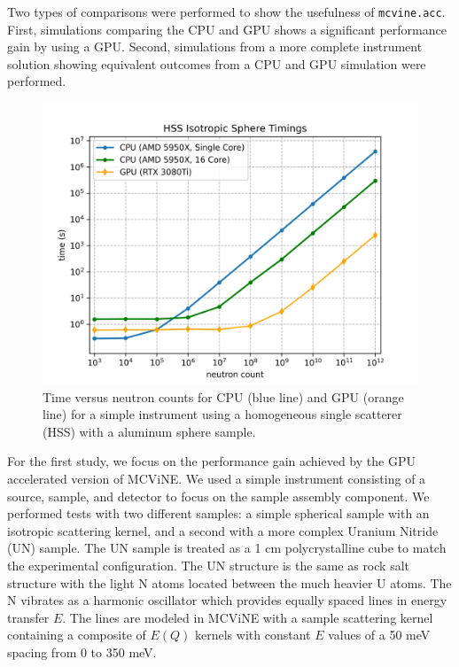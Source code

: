 Two types of comparisons were performed to show the usefulness of \texttt{mcvine.acc}. First, simulations comparing the CPU and GPU shows a significant performance gain by using a GPU.
Second, simulations from a more complete instrument solution showing equivalent outcomes from a CPU and GPU simulation were performed. 

\begin{figure}[h]
    \centering
    \includegraphics[width=\columnwidth]{figures/mcvine_hss_isotropic_timings.png}
    \caption{Time versus neutron counts for CPU (blue line) and GPU (orange line) for a simple instrument using a homogeneous single scatterer (HSS) with a aluminum sphere sample.}
    \label{fig:results_isotropic_sphere}
\end{figure}

For the first study, we focus on the performance gain achieved by the GPU accelerated version of MCViNE.
We used a simple instrument consisting of a source, sample, and detector to focus on the sample assembly component. 
We performed tests with two different samples: a simple spherical sample with an isotropic scattering kernel, and a second with a more complex Uranium Nitride (UN) sample.
The UN sample is treated as a 1 cm polycrystalline cube to match the experimental configuration\cite{aczel2012quantum}. 
The UN structure is the same as  rock salt structure with the light N atoms located between the much heavier U atoms.  
The N vibrates as a harmonic oscillator which provides equally spaced lines in energy transfer $E$.
The lines are modeled in MCViNE with a sample scattering kernel containing a composite of $E(Q)$ kernels with constant $E$ values of a 50 meV spacing from 0 to 350 meV.

